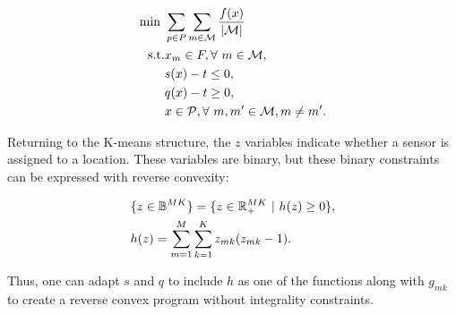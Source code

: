 \begin{subequations}\label{multipleReverseTransformedModel}
\begin{align}                                               
\min \ &\sum\limits_{p \in P}\sum\limits_{m \in \cM} \frac{f(x)}{|\cM|} \\
\text{s.t.} & x_{m} \in F, \forall \ m \in \cM, \label{mRT:gravelConstraint}\\
& s(x) - t \leq 0,\\
& q(x) - t \geq 0,\\
&x \in \cP, \forall \ m, m' \in \cM, m \neq m'. \label{mRT:radiusConstraint}
\end{align}
\end{subequations}


Returning to the K-means structure, the $z$ variables indicate whether a sensor is assigned to a location. These variables are binary, but these binary constraints can be expressed with reverse convexity:

\begin{align*}
&\{z \in \mathbb{B}^{MK}\} = \{z \in \mathbb{R}^{MK}_{+} \text{ }|\text{ } h(z) \geq 0\},\\
&h(z) = \sum\limits_{m = 1}^{M}\sum\limits_{k = 1}^{K} z_{mk}(z_{mk} - 1).
\end{align*}

Thus, one can adapt $s$ and $q$ to include $h$ as one of the functions along with $g_{mk}$ to create a reverse convex program without integrality constraints.